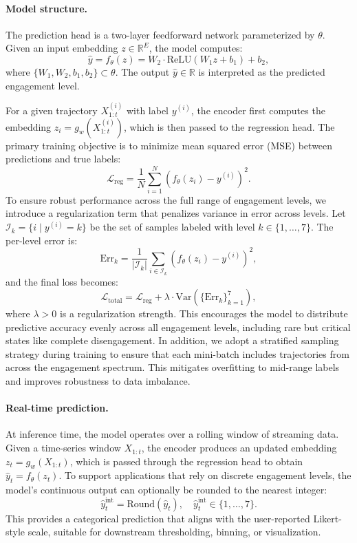 \documentclass[review]{vgtc}                 %
\begin{document}
\paragraph{Model structure.}
The prediction head is a two-layer feedforward network parameterized by \( \theta \). Given an input embedding \( z \in \mathbb{R}^E \), the model computes:
\[
\hat{y} = f_\theta(z) = W_2 \cdot \mathrm{ReLU}(W_1 z + b_1) + b_2,
\]
where \( \{W_1, W_2, b_1, b_2\} \subset \theta \). The output \( \hat{y} \in \mathbb{R} \) is interpreted as the predicted engagement level.

For a given trajectory \( X^{(i)}_{1:t} \) with label \( y^{(i)} \), the encoder first computes the embedding \( z_i = g_w(X^{(i)}_{1:t}) \), which is then passed to the regression head. The primary training objective is to minimize mean squared error (MSE) between predictions and true labels:
\[
\mathcal{L}_{\text{reg}} = \frac{1}{N} \sum_{i=1}^{N} \left( f_\theta(z_i) - y^{(i)} \right)^2.
\]
To ensure robust performance across the full range of engagement levels, we introduce a regularization term that penalizes variance in error across levels. Let \( \mathcal{I}_k = \{i \mid y^{(i)} = k\} \) be the set of samples labeled with level \( k \in \{1, \dots, 7\} \). The per-level error is:
\[
\text{Err}_k = \frac{1}{|\mathcal{I}_k|} \sum_{i \in \mathcal{I}_k} \left( f_\theta(z_i) - y^{(i)} \right)^2,
\]
and the final loss becomes:
\[
\mathcal{L}_{\text{total}} = \mathcal{L}_{\text{reg}} 
+ \lambda \cdot \mathrm{Var}\left( \{\text{Err}_k\}_{k=1}^{7} \right),
\]
where \( \lambda > 0 \) is a regularization strength. This encourages the model to distribute predictive accuracy evenly across all engagement levels, including rare but critical states like complete disengagement.
In addition, we adopt a stratified sampling strategy during training to ensure that each mini-batch includes trajectories from across the engagement spectrum. This mitigates overfitting to mid-range labels and improves robustness to data imbalance.

\paragraph{Real-time prediction.}
At inference time, the model operates over a rolling window of streaming data. Given a time-series window \( X_{1:t} \), the encoder produces an updated embedding \( z_t = g_w(X_{1:t}) \), which is passed through the regression head to obtain \( \hat{y}_t = f_\theta(z_t) \). To support applications that rely on discrete engagement levels, the model’s continuous output can optionally be rounded to the nearest integer:
\[
\hat{y}^{\text{int}}_t = \text{Round}\left( \hat{y}_t \right), \quad \hat{y}^{\text{int}}_t \in \{1, \dots, 7\}.
\]
This provides a categorical prediction that aligns with the user-reported Likert-style scale, suitable for downstream thresholding, binning, or visualization.
\end{document}
